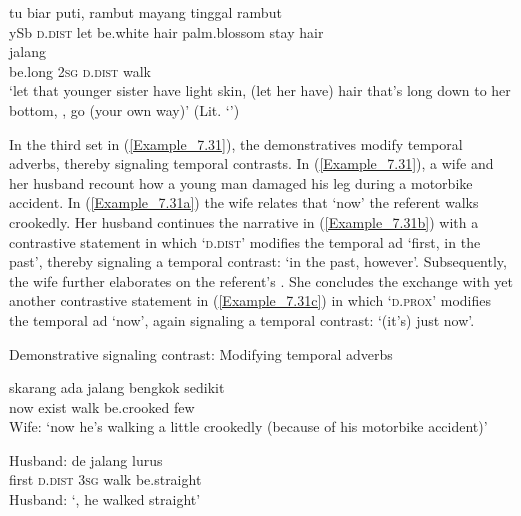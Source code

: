 {\ea
\label{Example_7.30}
 {{tu}} {{biar}} {{puti,}} {rambut} {mayang} {tinggal} {rambut}\\ %
 ySb  {\textsc{d.dist}}  {let}  {be.white}  hair  palm.blossom  stay  hair\\
  {}  {}  {jalang}\\
 {be.long}  {\textsc{2sg}}  {\textsc{d.dist}}  {walk}\\
\glt 
‘let that younger sister have light skin, (let her have) hair that’s long down to her bottom, , go (your own way)’ (Lit. ‘’) \textstyleExampleSource{[081115-001a-Cv.0244]}
\z



In the third set in (\ref{Example_7.31}), the demonstratives modify temporal adverbs, thereby signaling temporal contrasts. In (\ref{Example_7.31}), a wife and her husband recount how a young man damaged his leg during a motorbike accident. In (\ref{Example_7.31a}) the wife relates that  ‘now’ the referent walks crookedly. Her husband continues the narrative in (\ref{Example_7.31b}) with a contrastive statement in which  ‘\textsc{d.dist}’ modifies the temporal ad  ‘first, in the past’, thereby signaling a temporal contrast:  ‘in the past, however’. Subsequently, the wife further elaborates on the referent’s . She concludes the exchange with yet another contrastive statement in (\ref{Example_7.31c}) in which  ‘\textsc{d.prox}’ modifies the temporal ad  ‘now’, again signaling a temporal contrast:  ‘(it’s) just now’.


\begin{styleExampleTitle}
Demonstrative signaling contrast: Modifying temporal adverbs
\end{styleExampleTitle}

\ea
\label{Example_7.31}
\ea
\label{Example_7.31a}
 {skarang} {ada} {jalang} {bengkok} {sedikit}\\ %
 { }      now  exist  walk  be.crooked  few\\
\glt
Wife: ‘now he’s walking a little crookedly (because of his motorbike accident)’
\vspace{5pt}

\ex
\label{Example_7.31b}
\gll  Husband:      de  jalang  lurus\\
 { }      first  \textsc{d.dist}  \textsc{3sg}  walk  be.straight\\
\glt
Husband: ‘, he walked straight’
\vspace{5pt}

}
